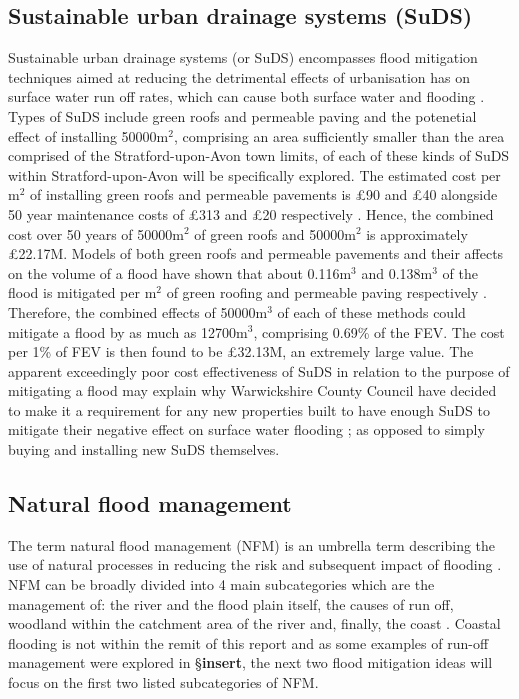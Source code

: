 \documentclass[11pt,a4paper]{article}
\begin{document}
\subsection{Sustainable urban drainage systems (SuDS)}
Sustainable urban drainage systems (or SuDS) encompasses flood mitigation techniques aimed at reducing the detrimental effects of urbanisation has on surface water run off rates, which can cause both surface water and flooding \cite{suds}. Types of SuDS include green roofs and permeable paving and the potenetial effect of installing 50000m$^2$, comprising an area sufficiently smaller than the area comprised of the Stratford-upon-Avon town limits, of each of these kinds of SuDS within Stratford-upon-Avon will be specifically explored. The estimated cost per m$^2$ of installing green roofs and permeable pavements is \pounds90 and \pounds40 alongside 50 year maintenance costs of \pounds313 and \pounds20 respectively \cite{cost3}. Hence, the combined cost over 50 years of 50000m$^2$ of green roofs and 50000m$^2$ is approximately \pounds22.17M. Models of both green roofs and permeable pavements and their affects on the volume of a flood have shown that about 0.116m$^3$ and 0.138m$^3$ of the flood is mitigated per m$^2$ of green roofing and permeable paving respectively \cite{suds}. Therefore, the combined effects of 50000m$^3$ of each of these methods could mitigate a flood by as much as 12700m$^3$, comprising 0.69\% of the FEV. The cost per 1\% of FEV is then found to be \pounds32.13M, an extremely large value. The apparent exceedingly poor cost effectiveness of SuDS in relation to the purpose of mitigating a flood may explain why Warwickshire County Council have decided to make it a requirement for any new properties built to have enough SuDS to mitigate their negative effect on surface water flooding \cite{war2}{;} as opposed to simply buying and installing new SuDS themselves.

\subsection{Natural flood management}
The term natural flood management (NFM) is an umbrella term describing the use of natural processes in reducing the risk and subsequent impact of flooding \cite{NFM}. NFM can be broadly divided into 4 main subcategories which are the management of: the river and the flood plain itself, the causes of run off, woodland within the catchment area of the river and, finally, the coast \cite{nfm}. Coastal flooding is not within the remit of this report and as some examples of run-off management were explored in \S \textbf{insert}, the next two flood mitigation ideas will focus on the first two listed subcategories of NFM.
\end{document}
